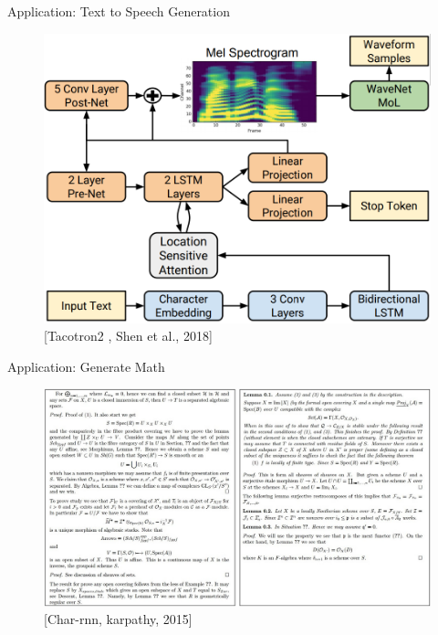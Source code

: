 \begin{frame}[allowframebreaks]{Application: Text to Speech Generation}
    \begin{figure}
    \centering
    \includegraphics[height=0.8\textheight]{images/dul/slide_35_1_img.png}
    \caption*{[Tacotron2 , Shen et al., 2018]}
    \end{figure}
\end{frame}

\begin{frame}[allowframebreaks]{Application: Generate Math}
    \begin{figure}
    \centering
    \includegraphics[height=0.8\textheight]{images/dul/slide_43_1_img.png}
    \caption*{[Char-rnn, karpathy, 2015]}
    \end{figure}
\end{frame}


